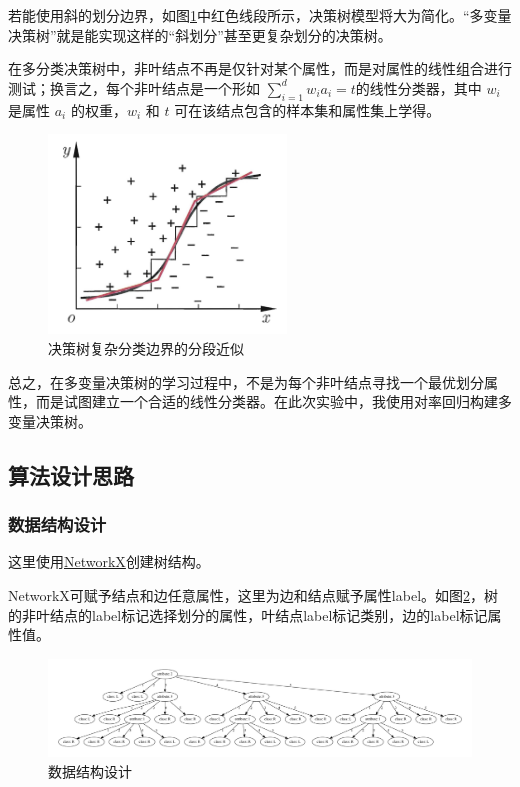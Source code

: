 \documentclass{ctexart}
\begin{document}
	若能使用斜的划分边界，如图\ref{决策树复杂分类边界的分段近似}中红色线段所示，决策树模型将大为简化。“多变量决策树”就是能实现这样的“斜划分”甚至更复杂划分的决策树。
	
	在多分类决策树中，非叶结点不再是仅针对某个属性，而是对属性的线性组合进行测试；换言之，每个非叶结点是一个形如 $\sum\limits_{i=1}^d w_ia_i=t$的线性分类器，其中 $w_i$ 是属性 $a_i$ 的权重，$w_i$ 和 $t$ 可在该结点包含的样本集和属性集上学得。
	
	\begin{figure}[!htb]
		\centering
		\includegraphics[scale=1,height=5.3cm]{../image/决策树复杂分类边界的分段近似.png}
		\caption{决策树复杂分类边界的分段近似}
		\label{决策树复杂分类边界的分段近似}
	\end{figure}

	总之，在多变量决策树的学习过程中，不是为每个非叶结点寻找一个最优划分属性，而是试图建立一个合适的线性分类器。在此次实验中，我使用对率回归构建多变量决策树。
	
	\subsection{算法设计思路}
	
	\subsubsection{数据结构设计}
	
	这里使用\href{https://networkx.org}{NetworkX}创建树结构。
	
	NetworkX可赋予结点和边任意属性，这里为边和结点赋予属性label。如图\ref{数据结构设计}，树的非叶结点的label标记选择划分的属性，叶结点label标记类别，边的label标记属性值。
	
	\begin{figure}[!htb]
		\centering
		\includegraphics[scale=1,width=\textwidth]{../image/post_pruning-Gain-balance-scale.gv.pdf}
		\caption{数据结构设计}
		\label{数据结构设计}
	\end{figure}
\end{document}
